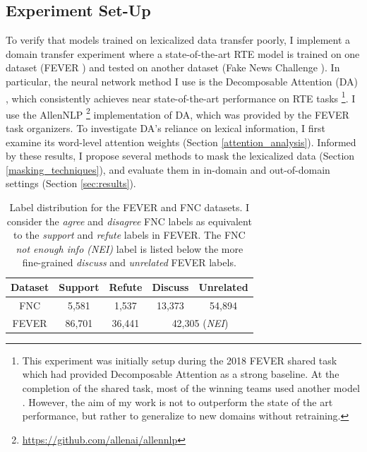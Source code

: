 \documentclass[compsoc,onecolumn]{IEEEtran}
\begin{document}
\subsection{Experiment Set-Up}
 
To verify that models trained on lexicalized data transfer poorly, I implement a domain transfer experiment where a state-of-the-art RTE model is trained on one dataset (FEVER \citep*{thorne2018fever}) and tested on another dataset (Fake News Challenge \citep*{pomerleau2017fake}). In particular, the neural network method I use is the Decomposable Attention (DA) \citep*{parikh2016decomposable}, which consistently achieves near state-of-the-art performance on RTE tasks \footnote{This experiment was initially setup during the 2018 FEVER shared task which had provided Decomposable Attention as a strong baseline. At the completion of the shared task, most of the winning teams used another model \citep*{chen2016enhanced}. However, the aim of my work is not to outperform the state of the art performance, but rather to generalize to new domains without retraining.}.  I use the AllenNLP \footnote{\url{https://github.com/allenai/allennlp}}
implementation of DA, which was provided by the FEVER task organizers. To investigate DA's reliance on lexical information, I first examine its word-level attention weights (Section \ref{attention_analysis}). 
Informed by these results, I propose several methods to mask the lexicalized data (Section \ref{masking_techniques}), and evaluate them in in-domain and  out-of-domain settings (Section \ref{sec:results}).




\begin{table}
    \centering
    \footnotesize
    \begin{tabular}{ccccc}
        Dataset & Support & Refute & Discuss & Unrelated \\
        \hline
        FNC    & 5,581 & 1,537  & 13,373 & 54,894 \\
        FEVER  &  86,701 & 36,441  & \multicolumn{2}{c}{42,305 (\textit{NEI})} \\  
    \end{tabular}
    \caption{Label distribution for the FEVER and FNC datasets.  I consider the \textit{agree} and \textit{disagree} FNC labels as equivalent to the \textit{support} and \textit{refute} labels in FEVER. The FNC \textit{not enough info (NEI)} label is listed below the more fine-grained \textit{discuss} and \textit{unrelated} FEVER labels.  }
    \label{tab:data}
\end{table}
\end{document}
